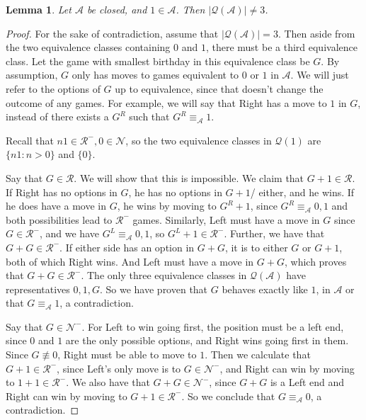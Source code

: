 \documentclass{amsart}
\theoremstyle{plain}
\newtheorem{lemma}[thm]{Lemma}
\theoremstyle{definition}
\theoremstyle{remark}
\numberwithin{equation}{section}
\numberwithin{thm}{section}
\begin{document}
 
\begin{lemma}
  \label{no one}
    Let $\mathscr{A}$ be closed, and $1 \in \mathscr{A}$. Then $|\mathcal{Q}(\mathscr{A})| \neq 3$.
\end{lemma}
\begin{proof}
For the sake of contradiction, assume that $|\mathcal{Q}(\mathscr{A})| = 3$. Then aside from the two equivalence classes containing $0$ and $1$, there must be a third equivalence class. Let the game with smallest birthday in this equivalence class be $G$. By assumption, $G$ only has moves to games equivalent to $0$ or $1$ in $\mathscr{A}$. We will just refer to the options of $G$ up to equivalence, since that doesn't change the outcome of any games. For example, we will say that Right has a move to $1$ in $G$, instead of there exists a $G^R$ such that $G^R \equiv_{\mathscr{A}} 1$.

 Recall that $n1 \in \mathcal{R}^-,0\in\mathcal{N}$, so the two equivalence classes in $\mathcal{Q}(1)$ are $\{n1 : n>0\}$  and $\{0\}$.

Say that $G \in \mathcal{R}$. We will show that this is impossible.
We claim that $G+1\in \mathcal{R}$. If Right has no options in $G$, he has no options in $G+1$/ either, and he wins. If he does have a move in $G$, he wins by moving to $G^R+1$, since $G^R \equiv_{\mathscr{A}} 0,1$ and both possibilities lead to $\mathcal{R}^-$ games. Similarly, Left must have a move in $G$ since $G\in\mathcal{R}^-$, and we have $G^L \equiv_{\mathscr{A}} 0,1$, so $G^L + 1 \in \mathcal{R}^-$.
Further, we have that $G+G \in \mathcal{R}^-$. If either side has an option in $G+G$, it is to either $G$ or $G+1$, both of which Right wins. And Left must have a move in $G+G$, which proves that $G+G \in \mathcal{R}^-$. The only three equivalence classes in $\mathcal{Q}(\mathscr{A})$ have representatives $0,1,G$. So we have proven that $G$ behaves exactly like $1$, in $\mathscr{A}$ or that $G\equiv_{\mathscr{A}} 1$, a contradiction.

Say that $G \in \mathcal{N}^-$. For Left to win going first, the position must be a left end, since $0$ and $1$ are the only possible options, and Right wins going first in them. Since $G \not \equiv 0$, Right must be able to move to $1$. Then we calculate that $G+1 \in \mathcal{R}^-$, since Left's only move is to $G \in \mathcal{N}^-$, and Right can win by moving to $1+1 \in \mathcal{R}^-$. We also have that $G+G \in \mathcal{N}^-$, since $G+G$ is a Left end and Right can win by moving to $G+1 \in \mathcal{R}^-$. So we conclude that $G \equiv_{\mathscr{A}} 0$, a contradiction.


\end{proof}
\end{document}
